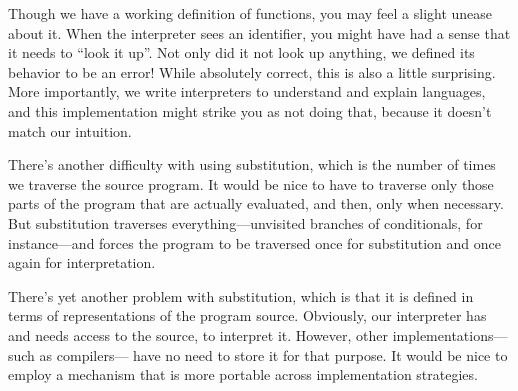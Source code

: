 \secdown

Though we have a working definition of functions, you may feel a slight unease
about it. When the interpreter sees an identifier, you might have had a sense
that it needs to “look it up”. Not only did it not look up anything, we defined
its behavior to be an error! While absolutely correct, this is also a little
surprising. More importantly, we write interpreters to understand and explain
languages, and this implementation might strike you as not doing that, because
it doesn’t match our intuition.

There’s another difficulty with using substitution, which is the number of times
we traverse the source program. It would be nice to have to traverse only those
parts of the program that are actually evaluated, and then, only when necessary.
But substitution traverses everything—unvisited branches of conditionals, for
instance—and forces the program to be traversed once for substitution and once
again for interpretation.


There’s yet another problem with substitution, which is that it is defined in
terms of representations of the program source. Obviously, our interpreter has
and needs access to the source, to interpret it. However, other
implementations—such as compilers— have no need to store it for that purpose.
It would be nice to employ a mechanism that is more portable across
implementation strategies.






\secup

